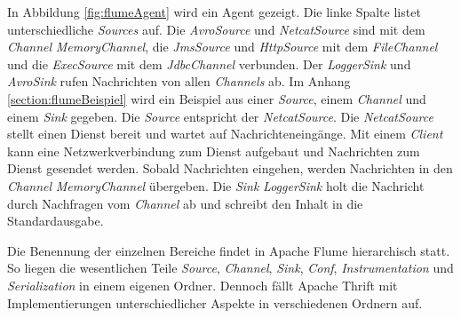 In Abbildung \ref{fig:flumeAgent} wird ein Agent gezeigt. Die linke Spalte listet unterschiedliche \textit{Sources} auf. Die \textit{AvroSource} und \textit{NetcatSource} sind mit dem \textit{Channel} \textit{MemoryChannel}, die \textit{JmsSource} und \textit{HttpSource} mit dem \textit{FileChannel} und die \textit{ExecSource} mit dem \textit{JdbcChannel} verbunden. Der \textit{LoggerSink} und \textit{AvroSink} rufen Nachrichten von allen \textit{Channels} ab. Im Anhang \ref{section:flumeBeispiel} wird ein Beispiel aus einer \textit{Source}, einem \textit{Channel} und einem \textit{Sink} gegeben. Die \textit{Source} entspricht der \textit{NetcatSource}. Die \textit{NetcatSource} stellt einen Dienst bereit und wartet auf Nachrichteneingänge. Mit einem \textit{Client} kann eine Netzwerkverbindung zum Dienst aufgebaut und Nachrichten zum Dienst gesendet werden. Sobald Nachrichten eingehen, werden Nachrichten in den \textit{Channel} \textit{MemoryChannel} übergeben. Die \textit{Sink} \textit{LoggerSink} holt die Nachricht durch Nachfragen vom \textit{Channel} ab und schreibt den Inhalt in die Standardausgabe.

Die Benennung der einzelnen Bereiche findet in Apache Flume hierarchisch statt. So liegen die wesentlichen Teile \textit{Source}, \textit{Channel}, \textit{Sink}, \textit{Conf}, \textit{Instrumentation} und \textit{Serialization} in einem eigenen Ordner. Dennoch fällt Apache Thrift mit Implementierungen unterschiedlicher Aspekte in verschiedenen Ordnern auf. 

